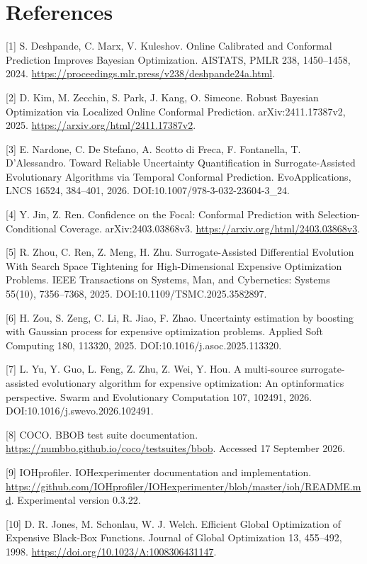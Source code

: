 \documentclass[11pt,a4paper]{article}
\begin{document}
\hypertarget{references}{%
\section{References}\label{references}}

{[}1{]} S. Deshpande, C. Marx, V. Kuleshov. Online Calibrated and
Conformal Prediction Improves Bayesian Optimization. AISTATS, PMLR 238,
1450--1458, 2024.
\url{https://proceedings.mlr.press/v238/deshpande24a.html}.

{[}2{]} D. Kim, M. Zecchin, S. Park, J. Kang, O. Simeone. Robust
Bayesian Optimization via Localized Online Conformal Prediction.
arXiv:2411.17387v2, 2025. \url{https://arxiv.org/html/2411.17387v2}.

{[}3{]} E. Nardone, C. De Stefano, A. Scotto di Freca, F. Fontanella, T.
D'Alessandro. Toward Reliable Uncertainty Quantification in
Surrogate-Assisted Evolutionary Algorithms via Temporal Conformal
Prediction. EvoApplications, LNCS 16524, 384--401, 2026.
DOI:10.1007/978-3-032-23604-3\_24.

{[}4{]} Y. Jin, Z. Ren. Confidence on the Focal: Conformal Prediction
with Selection-Conditional Coverage. arXiv:2403.03868v3.
\url{https://arxiv.org/html/2403.03868v3}.

{[}5{]} R. Zhou, C. Ren, Z. Meng, H. Zhu. Surrogate-Assisted
Differential Evolution With Search Space Tightening for High-Dimensional
Expensive Optimization Problems. IEEE Transactions on Systems, Man, and
Cybernetics: Systems 55(10), 7356--7368, 2025.
DOI:10.1109/TSMC.2025.3582897.

{[}6{]} H. Zou, S. Zeng, C. Li, R. Jiao, F. Zhao. Uncertainty estimation
by boosting with Gaussian process for expensive optimization problems.
Applied Soft Computing 180, 113320, 2025.
DOI:10.1016/j.asoc.2025.113320.

{[}7{]} L. Yu, Y. Guo, L. Feng, Z. Zhu, Z. Wei, Y. Hou. A multi-source
surrogate-assisted evolutionary algorithm for expensive optimization: An
optinformatics perspective. Swarm and Evolutionary Computation 107,
102491, 2026. DOI:10.1016/j.swevo.2026.102491.

{[}8{]} COCO. BBOB test suite documentation.
\url{https://numbbo.github.io/coco/testsuites/bbob}. Accessed 17
September 2026.

{[}9{]} IOHprofiler. IOHexperimenter documentation and implementation.
\url{https://github.com/IOHprofiler/IOHexperimenter/blob/master/ioh/README.md}.
Experimental version 0.3.22.

{[}10{]} D. R. Jones, M. Schonlau, W. J. Welch. Efficient Global
Optimization of Expensive Black-Box Functions. Journal of Global
Optimization 13, 455--492, 1998.
\url{https://doi.org/10.1023/A:1008306431147}.
\end{document}
